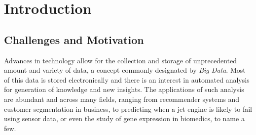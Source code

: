 \chapter{Introduction}
\label{chapter:introduction}


\section{Challenges and Motivation}

 



Advances in technology allow for the collection and storage of unprecedented amount and variety of data, a concept commonly designated by \emph{Big Data}.
Most of this data is stored electronically and there is an interest in automated analysis for generation of knowledge and new insights.
The applications of such analysis are abundant and across many fields, ranging from recommender systems and customer segmentation in business, to predicting when a jet engine is likely to fail using sensor data, or even the study of gene expression in biomedics, to name a few.

